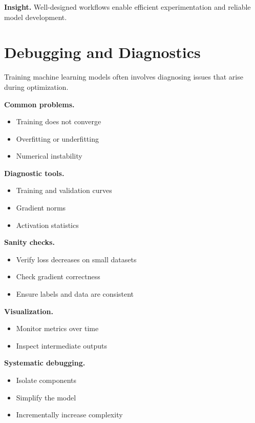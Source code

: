 \medskip

\noindent
\textbf{Insight.}  
Well-designed workflows enable efficient experimentation and reliable model development.

\section{Debugging and Diagnostics}

Training machine learning models often involves diagnosing issues that arise during optimization.

\medskip

\noindent
\textbf{Common problems.}
\begin{itemize}
    \item Training does not converge
    \item Overfitting or underfitting
    \item Numerical instability
\end{itemize}

\medskip

\noindent
\textbf{Diagnostic tools.}
\begin{itemize}
    \item Training and validation curves
    \item Gradient norms
    \item Activation statistics
\end{itemize}

\medskip

\noindent
\textbf{Sanity checks.}
\begin{itemize}
    \item Verify loss decreases on small datasets
    \item Check gradient correctness
    \item Ensure labels and data are consistent
\end{itemize}

\medskip

\noindent
\textbf{Visualization.}
\begin{itemize}
    \item Monitor metrics over time
    \item Inspect intermediate outputs
\end{itemize}

\medskip

\noindent
\textbf{Systematic debugging.}
\begin{itemize}
    \item Isolate components
    \item Simplify the model
    \item Incrementally increase complexity
\end{itemize}

